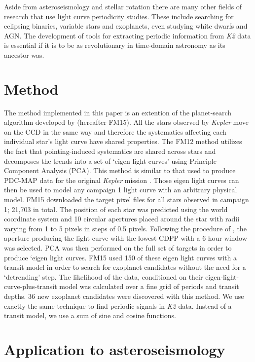 \documentclass[useAMS, usenatbib]{aastex}
\begin{document}
Aside from asteroseismology and stellar rotation there are many other fields
of research that use light curve periodicity studies.
These include searching for eclipsing binaries, variable stars and exoplanets,
even studying white dwarfs and AGN.
The development of tools for extracting periodic information from {\it K2}
data is essential if it is to be as revolutionary in time-domain
astronomy as its ancestor was.

\section{Method}
\label{Method}

The method implemented in this paper is an extention of the planet-search
algorithm developed by \citet{Foreman-Mackey2015} (hereafter FM15).
All the stars observed by {\it Kepler} move on the CCD in the same way and
therefore the systematics affecting each individual star's light curve have
shared properties.
The FM12 method utilizes the fact that pointing-induced systematics are shared
across stars and decomposes the trends into a set of `eigen light curves'
using Principle Component Analysis (PCA).
This method is similar to that used to produce PDC-MAP data for the original
{\it Kepler} mission \citep[][]{Stumpe2012, Smith2012}.
Those eigen light curves can then be used to model any campaign 1 {\it }light
curve with an arbitrary physical model.
FM15 downloaded the target pixel files for all stars observed in campaign 1;
21,703 in total.
The position of each star was predicted using the world coordinate system and
10 circular apertures placed around the star with radii varying from 1 to
5 pixels in steps of 0.5 pixels.
Following the procedure of \citet{Vanderburg2014}, the aperture producing the
light curve with the lowest CDPP with a 6 hour window \citet{Christiansen2012}
was selected.
PCA was then performed on the full set of targets in order to produce `eigen
light curves.
FM15 used 150 of these eigen light curves with a transit model in order to
search for exoplanet candidates without the need for a `detrending' step.
The likelihood of the data, conditioned on their eigen-light-curve-plus-transit
model was calculated over a fine grid of periods and transit depths.
36 new exoplanet candidates were discovered with this method.
We use exactly the same technique to find periodic signals in {\it K2} data.
Instead of a transit model, we use a sum of sine and cosine functions.

\section{Application to asteroseismology}
\end{document}
